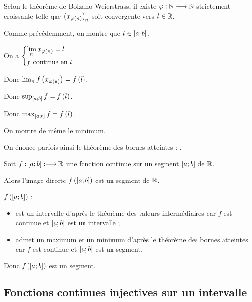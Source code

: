 \begin{dem}
Selon le théorème de Bolzano-Weierstrass, il existe \(\varphi:\mathbb{N}\longrightarrow\mathbb{N}\) strictement croissante telle que \(\left(x_{\varphi\left(n\right)}\right)_n\) soit convergente vers \(l\in\mathbb{R}\).

Comme précédemment, on montre que \(l\in\left[a;b\right]\).

On a \(\begin{dcases}\lim_nx_{\varphi\left(n\right)}=l \\ f\text{ continue en }l\end{dcases}\)

Donc \(\lim_nf\left(x_{\varphi\left(n\right)}\right)=f\left(l\right)\).

Donc \(\sup_{\left[a;b\right]}f=f\left(l\right)\).

Donc \(\max_{\left[a;b\right]}f=f\left(l\right)\).

On montre de même le minimum.
\end{dem}

\begin{rem}
On énonce parfois ainsi le théorème des bornes atteintes : .
\end{rem}

\begin{cor}
Soit \(f:\left[a;b\right]:\longrightarrow\mathbb{R}\) une fonction continue sur un segment \(\left[a;b\right]\) de \(\mathbb{R}\).

Alors l'image directe \(f\left(\left[a;b\right]\right)\) est un segment de \(\mathbb{R}\).
\end{cor}

\begin{dem}
\(f\left(\left[a;b\right]\right)\) :

\begin{itemize}
\item est un intervalle d'après le théorème des valeurs intermédiaires car \(f\) est continue et \(\left[a;b\right]\) est un intervalle ; \\

\item admet un maximum et un minimum d'après le théorème des bornes atteintes car \(f\) est continue et \(\left[a;b\right]\) est un segment.
\end{itemize}

Donc \(f\left(\left[a;b\right]\right)\) est un segment.
\end{dem}

\subsection{Fonctions continues injectives sur un intervalle}

